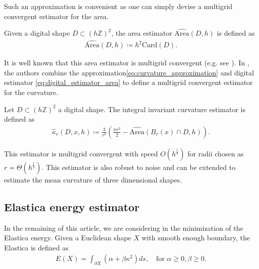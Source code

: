 \documentclass[smallextended]{svjour3}       %
\begin{document}
Such an approximation is convenient as one can simply devise a multigrid convergent estimator for the area.

\begin{definition}	
  Given a digital shape $D \subset (h \mathbb{Z})^2$,  the area estimator $\widehat{\text{Area}}(D,h)$ is defined as	
  \begin{align}
    \widehat{\text{Area}}(D,h) \coloneqq h^2\text{Card}\left( D \right).	
    \label{eq:digital_estimator_area}
  \end{align}
\end{definition}
It is well known that this area estimator is multigrid convergent
(e.g. see \cite{klette2000multigrid}).  In
\cite{coeurjolly13integral}, the authors combine the
approximation\eqref{eq:curvature_approximation} and digital estimator
\eqref{eq:digital_estimator_area} to define a multigrid convergent
estimator for the curvature.

\begin{definition}
  Let $D \subset (h \mathbb{Z})^2$ a digital shape. The integral invariant curvature estimator is defined as
  \begin{align*}
    \hat{\kappa}_{r}(D,x,h) \coloneqq \frac{3}{r^3} \left( \frac{\pi r^2}{2} - \widehat{\text{Area}} \left( B_{r} ( x ) \cap D, h \right) \right).
  \end{align*}
\end{definition}

This estimator is multigrid convergent with speed $O(h^\frac{1}{3})$
for radii chosen as $r=\Theta(h^\frac{1}{3})$.  This estimator is also
robust to noise and can be extended to estimate the mean curvature of
three dimensional shapes.

\subsection{Elastica energy estimator}

In the remaining of this article, we are considering in the minimization of the Elastica energy. Given a Euclidean shape $X$ with smooth enough boundary, the Elastica is defined as
\begin{align}
  E(X) = \int_{\partial X}{(\alpha + \beta \kappa^2) ds}, \quad \text{for~} \alpha \ge 0, \beta \ge 0.
  \label{eq:elastica}
\end{align}
\end{document}
